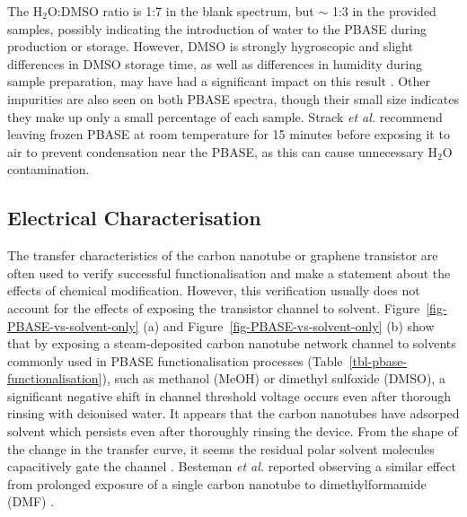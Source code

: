 \documentclass[
  a4paper,
]{scrbook}
\begin{document}
The H\(_{2}\)O:DMSO ratio is 1:7 in the blank spectrum, but \(\sim\) 1:3
in the provided samples, possibly indicating the introduction of water
to the PBASE during production or storage. However, DMSO is strongly
hygroscopic and slight differences in DMSO storage time, as well as
differences in humidity during sample preparation, may have had a
significant impact on this result \autocite{Lebel1962}. Other impurities
are also seen on both PBASE spectra, though their small size indicates
they make up only a small percentage of each sample. Strack \emph{et
al.} \autocite{Strack2013} recommend leaving frozen PBASE at room
temperature for 15 minutes before exposing it to air to prevent
condensation near the PBASE, as this can cause unnecessary H\(_2\)O
contamination.

\hypertarget{sec-PBASE-electrical-characterisation}{%
\subsection{Electrical
Characterisation}\label{sec-PBASE-electrical-characterisation}}

The transfer characteristics of the carbon nanotube or graphene
transistor are often used to verify successful functionalisation and
make a statement about the effects of chemical modification. However,
this verification usually does not account for the effects of exposing
the transistor channel to solvent.
Figure~\ref{fig-PBASE-vs-solvent-only} (a) and
Figure~\ref{fig-PBASE-vs-solvent-only} (b) show that by exposing a
steam-deposited carbon nanotube network channel to solvents commonly
used in PBASE functionalisation processes
(Table~\ref{tbl-pbase-functionalisation}), such as methanol (MeOH) or
dimethyl sulfoxide (DMSO), a significant negative shift in channel
threshold voltage occurs even after thorough rinsing with deionised
water. It appears that the carbon nanotubes have adsorped solvent which
persists even after thoroughly rinsing the device. From the shape of the
change in the transfer curve, it seems the residual polar solvent
molecules capacitively gate the channel
\autocite{Artyukhin2006,Heller2008}. Besteman \emph{et al.} reported
observing a similar effect from prolonged exposure of a single carbon
nanotube to dimethylformamide (DMF) \autocite{Besteman2003}.
\end{document}
